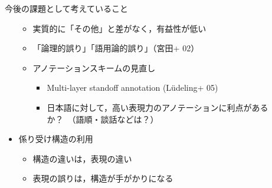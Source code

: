 \documentclass[12pt]{beamer}
\newcommand{\mynum}[2]{%
	{\color{#1}\fontsize{50pt}{0pt}\selectfont\dejavu{\char"#2}\hspace*{-0.35em}}
}
\begin{document}
\begin{frame}
\begin{columns}
\begin{column}{.49\linewidth}
\begin{block}{今後の課題として考えていること}
\begin{itemize}
\begin{itemize}
							\item 実質的に「その他」と差がなく，有益性が低い
							\item 「論理的誤り」「語用論的誤り」（宮田+ 02）
							\item アノテーションスキームの見直し
								\begin{itemize}
									\item Multi-layer standoff annotation (Lüdeling+ 05)
									\item 日本語に対して，高い表現力のアノテーションに利点があるか？\ （語順・談話などは？）
								\end{itemize}
						\end{itemize}
					\item[\mynum{blue}{277B}]
						係り受け構造の利用
						\begin{itemize}
							\item 構造の違いは，表現の違い
							\item 表現の誤りは，構造が手がかりになる
						\end{itemize}
				\end{itemize}

			\end{block}

		\end{column}

	\end{columns}
\end{frame}
\end{document}
